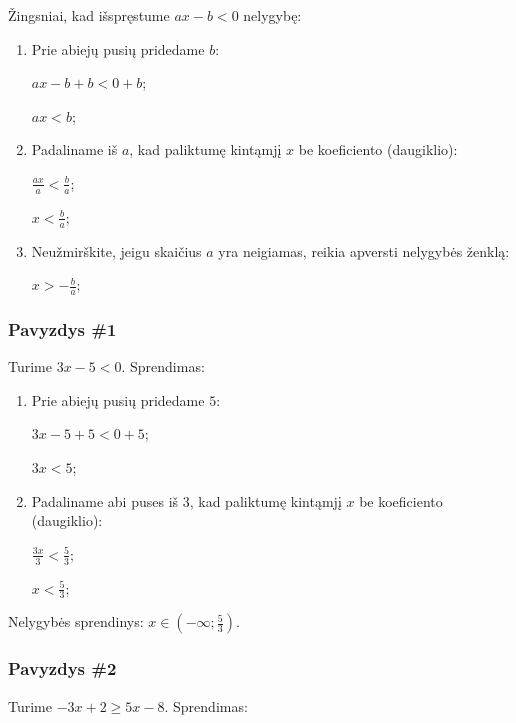 \documentclass[a4paper]{article}
\begin{document}
Žingsniai, kad išspręstume $ax-b<0$ nelygybę:

\begin{enumerate}
      \item Prie abiejų pusių pridedame $b$:

            $ax-b+b<0+b$;

            $ax<b$;

      \item Padaliname iš $a$, kad paliktumę kintąmjį $x$ be koeficiento
            (daugiklio):

            $\frac{ax}{a}<\frac{b}{a}$;

            $x<\frac{b}{a}$;

      \item Neužmirškite, jeigu skaičius $a$ yra neigiamas, reikia apversti
            nelygybės ženklą:

            $x>-\frac{b}{a}$;

\end{enumerate}

\subsubsection{Pavyzdys \#1}

Turime $3x-5 < 0$. Sprendimas:

\begin{enumerate}
      \item Prie abiejų pusių pridedame $5$:

            $3x-5+5<0+5$;

            $3x<5$;

      \item Padaliname abi puses iš $3$, kad paliktumę kintąmjį $x$ be
            koeficiento (daugiklio):

            $\frac{3x}{3}<\frac{5}{3}$;

            $x<\frac{5}{3}$;

\end{enumerate}

Nelygybės sprendinys: $x\in (-\infty;\frac{5}{3})$.

\subsubsection{Pavyzdys \#2}

Turime $-3x+2\geq 5x-8$. Sprendimas:
\end{document}
